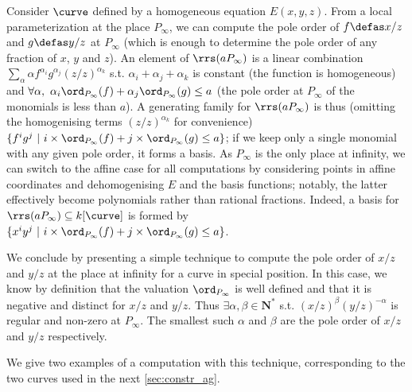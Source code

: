Consider $\curve$ defined by a homogeneous equation $E(x,y,z)$. From a local parameterization at the place $P_\infty$, we can compute the pole order of
$f \defas x/z$ and $g \defas y/z$ at $P_\infty$ (which is enough to determine the pole
order of any fraction of $x$, $y$ and $z$).
An element of $\rrs(aP_\infty)$ is a linear combination $\sum_\alpha \alpha f^{\alpha_i}g^{\alpha_j}(z/z)^{\alpha_k}$ s.t. $\alpha_i + \alpha_j + \alpha_k$ is constant (the function is
homogeneous) and $\forall \alpha,~\alpha_i\ord_{P_\infty}(f) + \alpha_j\ord_{P_\infty}(g) \leq a$ (the pole order at $P_\infty$ of the monomials is less
than $a$).
A generating family for $\rrs(aP_\infty)$ is thus (omitting the homogenising terms $(z/z)^{\alpha_k}$ for convenience) $\{f^ig^j~|~i\times\ord_{P_\infty}(f) + j\times\ord_{P_\infty}(g) \leq a\}$; if we keep only a single monomial
with any given pole order, it forms a basis.
As $P_\infty$ is the only place at infinity, we can switch to the affine case for all computations by considering points in affine coordinates and dehomogenising $E$ and the basis functions; notably, the latter effectively become polynomials rather
than rational fractions. Indeed, a basis for $\rrs(aP_\infty) \subseteq k[\curve]$ is formed by $\{x^iy^j~|~i\times\ord_{P_\infty}(f) + j\times\ord_{P_\infty}(g) \leq a\}$.

\medskip

We conclude by presenting a simple technique to compute the pole order of $x/z$ and $y/z$ at the place at infinity for a curve in special position.
In this case, we know by definition that the valuation $\ord_{P_\infty}$ is well defined and that it is negative and distinct for $x/z$ and $y/z$.
Thus $\exists \alpha,\beta \in \mathbf{N}^*$ s.t. $(x/z)^\beta(y/z)^{-\alpha}$ is regular and non-zero at $P_\infty$. The smallest such $\alpha$
and $\beta$ are the pole order of $x/z$ and $y/z$ respectively.

We give two examples of a computation with this technique, corresponding to the two curves used in the next \autoref{sec:constr_ag}.

